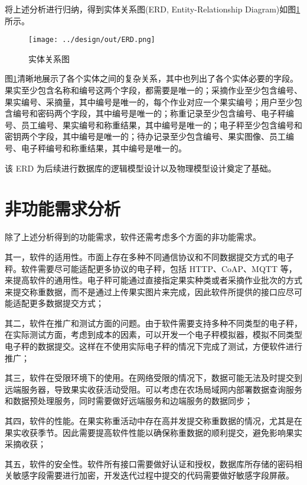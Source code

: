 将上述分析进行归纳，得到实体关系图(ERD, Entity-Relationship Diagram)如图\ref{fig:ERD}所示。

\begin{figure}[H]
    \centering
    \texttt{[image: ../design/out/ERD.png]}
    \caption{实体关系图}
    \label{fig:ERD}
\end{figure}

图\ref{fig:ERD}清晰地展示了各个实体之间的复杂关系，其中也列出了各个实体必要的字段。果实至少包含名称和编号这两个字段，都需要是唯一的；采摘作业至少包含编号、果实编号、采摘量，其中编号是唯一的，每个作业对应一个果实编号；用户至少包含编号和密码两个字段，其中编号是唯一的；称重记录至少包含编号、电子秤编号、员工编号、果实编号和称重结果，其中编号是唯一的；电子秤至少包含编号和密钥两个字段，其中编号是唯一的；待办记录至少包含编号、果实图像、员工编号、电子秤编号和称重结果，其中编号是唯一的。

该 ERD 为后续进行数据库的逻辑模型设计以及物理模型设计奠定了基础。

\section{非功能需求分析}\label{sec:req2}

除了上述分析得到的功能需求，软件还需考虑多个方面的非功能需求。

其一，软件的适用性。市面上存在多种不同通信协议和不同数据提交方式的电子秤。软件需要尽可能适配更多协议的电子秤，包括 HTTP、CoAP、MQTT 等，来提高软件的通用性。电子秤可能通过直接指定果实种类或者采摘作业批次的方式来提交称重数据，而不是通过上传果实图片来完成，因此软件所提供的接口应尽可能适配更多数据提交方式；

其二，软件在推广和测试方面的问题。由于软件需要支持多种不同类型的电子秤，在实际测试方面，考虑到成本的因素，可以开发一个电子秤模拟器，模拟不同类型电子秤的数据提交。这样在不使用实际电子秤的情况下完成了测试，方便软件进行推广；

其三，软件在受限环境下的使用。在网络受限的情况下，数据可能无法及时提交到远端服务器，导致果实收获活动受阻。可以考虑在农场局域网内部署数据查询服务和数据预处理服务，同时需要做好远端服务和边端服务的数据同步；

其四，软件的性能。在果实称重活动中存在高并发提交称重数据的情况，尤其是在果实收获季节。因此需要提高软件性能以确保称重数据的顺利提交，避免影响果实采摘收获；

其五，软件的安全性。软件所有接口需要做好认证和授权，数据库所存储的密码相关敏感字段需要进行加密，开发迭代过程中提交的代码需要做好敏感字段屏蔽。


